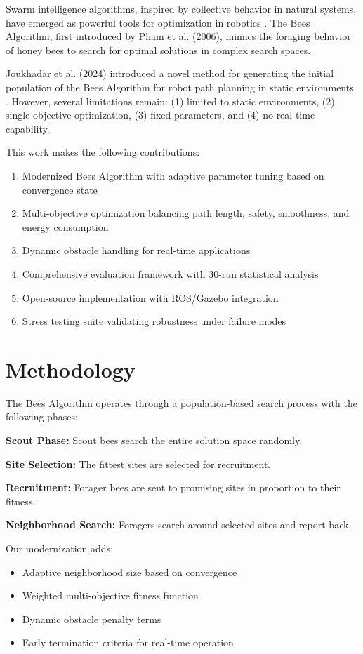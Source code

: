 \documentclass[review]{elsarticle}
\begin{document}
Swarm intelligence algorithms, inspired by collective behavior in natural systems, have emerged as powerful tools for optimization in robotics \cite{pham2006}. The Bees Algorithm, first introduced by Pham et al. (2006), mimics the foraging behavior of honey bees to search for optimal solutions in complex search spaces.

Joukhadar et al. (2024) introduced a novel method for generating the initial population of the Bees Algorithm for robot path planning in static environments \cite{joukhadar2024}. However, several limitations remain: (1) limited to static environments, (2) single-objective optimization, (3) fixed parameters, and (4) no real-time capability.

This work makes the following contributions:
\begin{enumerate}
    \item Modernized Bees Algorithm with adaptive parameter tuning based on convergence state
    \item Multi-objective optimization balancing path length, safety, smoothness, and energy consumption
    \item Dynamic obstacle handling for real-time applications
    \item Comprehensive evaluation framework with 30-run statistical analysis
    \item Open-source implementation with ROS/Gazebo integration
    \item Stress testing suite validating robustness under failure modes
\end{enumerate}

\section{Methodology}

The Bees Algorithm operates through a population-based search process with the following phases:

\textbf{Scout Phase:} Scout bees search the entire solution space randomly.

\textbf{Site Selection:} The fittest sites are selected for recruitment.

\textbf{Recruitment:} Forager bees are sent to promising sites in proportion to their fitness.

\textbf{Neighborhood Search:} Foragers search around selected sites and report back.

Our modernization adds:
\begin{itemize}
    \item Adaptive neighborhood size based on convergence
    \item Weighted multi-objective fitness function
    \item Dynamic obstacle penalty terms
    \item Early termination criteria for real-time operation
\end{itemize}
\end{document}
